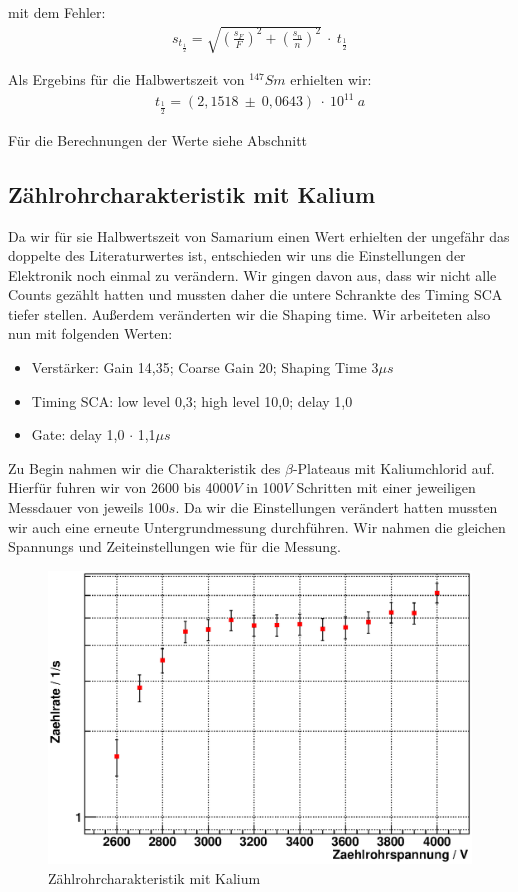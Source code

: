 \documentclass[12pt]{article}
\begin{document}
mit dem Fehler:
\begin{align}
 s_{t_{\frac{1}{2}}} = \sqrt{\left(\frac{s_F}{F}\right)^2 + \left(\frac{s_n}{n}\right)^2}~\cdot~t_{\frac{1}{2}}
\end{align}

Als Ergebins für die Halbwertszeit von $^{147}Sm$ erhielten wir:
\begin{align*}
 t_{\frac{1}{2}} = (2,1518~\pm~0,0643)~\cdot~10^11~a
\end{align*}

Für die Berechnungen der Werte siehe Abschnitt %

\subsection{Zählrohrcharakteristik mit Kalium}
Da wir für sie Halbwertszeit von Samarium einen Wert erhielten der ungefähr das doppelte des Literaturwertes ist, entschieden wir uns die Einstellungen der Elektronik noch einmal zu verändern. Wir gingen davon aus, dass wir nicht alle Counts gezählt hatten und mussten daher die untere Schrankte des Timing SCA tiefer stellen. Außerdem veränderten wir die Shaping time. Wir arbeiteten also nun mit folgenden Werten:

\begin{itemize}
 \item Verstärker: Gain 14,35; Coarse Gain 20; Shaping Time 3$\mu s$
 \item Timing SCA: low level 0,3; high level 10,0; delay 1,0
 \item Gate: delay 1,0 $\cdot$ 1,1$\mu s$
\end{itemize}

Zu Begin nahmen wir die Charakteristik des $\beta$-Plateaus mit Kaliumchlorid auf. Hierfür fuhren wir von 2600 bis 4000$V$ in 100$V$ Schritten mit einer jeweiligen
Messdauer von jeweils 100$s$.
Da wir die Einstellungen verändert hatten mussten wir auch eine erneute Untergrundmessung durchführen. Wir nahmen die gleichen Spannungs und Zeiteinstellungen wie für die Messung.

\begin{figure}[H]  
\centering
\includegraphics[width=0.9\linewidth]{pictures/char_kalium.eps}
\caption{Zählrohrcharakteristik mit Kalium}
\end{figure}
\end{document}
